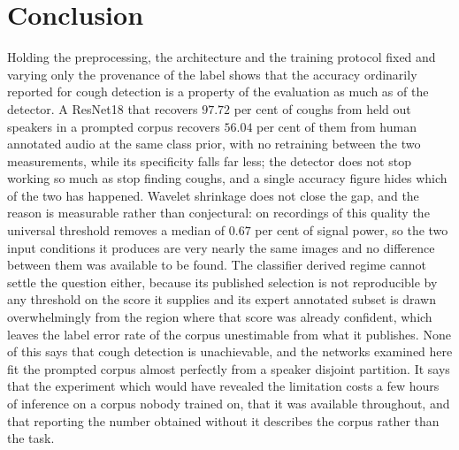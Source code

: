 \section{Conclusion}\label{sec:conclusion}

Holding the preprocessing, the architecture and the training protocol fixed and varying
only the provenance of the label shows that the accuracy ordinarily reported for cough
detection is a property of the evaluation as much as of the detector. A ResNet18 that
recovers $97.72$ per cent of coughs from held out speakers in a prompted corpus recovers
$56.04$ per cent of them from human annotated audio at the same class prior, with no
retraining between the two measurements, while its specificity falls far less; the
detector does not stop working so much as stop finding coughs, and a single accuracy
figure hides which of the two has happened. Wavelet shrinkage does not close the gap, and
the reason is measurable rather than conjectural: on recordings of this quality the
universal threshold removes a median of $0.67$ per cent of signal power, so the two input
conditions it produces are very nearly the same images and no difference between them was
available to be found. The classifier derived regime cannot settle the question either,
because its published selection is not reproducible by any threshold on the score it
supplies and its expert annotated subset is drawn overwhelmingly from the region where
that score was already confident, which leaves the label error rate of the corpus
unestimable from what it publishes. None of this says that cough detection is
unachievable, and the networks examined here fit the prompted corpus almost perfectly from
a speaker disjoint partition. It says that the experiment which would have revealed the
limitation costs a few hours of inference on a corpus nobody trained on, that it was
available throughout, and that reporting the number obtained without it describes the
corpus rather than the task.
